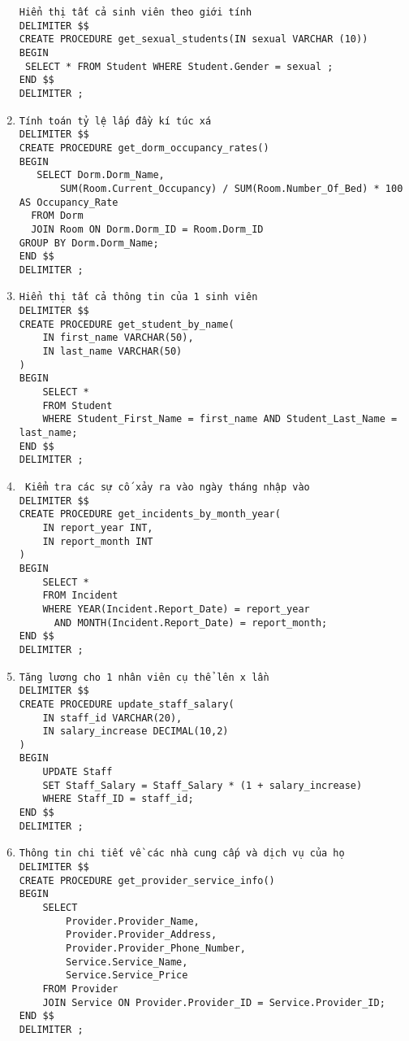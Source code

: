 \documentclass[a4paper,12pt]{article}
\begin{document}
\begin{enumerate}
\begin{verbatim}
Hiển thị tất cả sinh viên theo giới tính
DELIMITER $$
CREATE PROCEDURE get_sexual_students(IN sexual VARCHAR (10))
BEGIN 
 SELECT * FROM Student WHERE Student.Gender = sexual ;
END $$
DELIMITER ;
\end{verbatim}
\item \begin{verbatim}
Tính toán tỷ lệ lấp đầy kí túc xá
DELIMITER $$
CREATE PROCEDURE get_dorm_occupancy_rates()
BEGIN
   SELECT Dorm.Dorm_Name,
       SUM(Room.Current_Occupancy) / SUM(Room.Number_Of_Bed) * 100 AS Occupancy_Rate
  FROM Dorm
  JOIN Room ON Dorm.Dorm_ID = Room.Dorm_ID
GROUP BY Dorm.Dorm_Name;
END $$
DELIMITER ;
\end{verbatim}
\item \begin{verbatim}
Hiển thị tất cả thông tin của 1 sinh viên 
DELIMITER $$
CREATE PROCEDURE get_student_by_name(
    IN first_name VARCHAR(50),
    IN last_name VARCHAR(50)
)
BEGIN
    SELECT * 
    FROM Student
    WHERE Student_First_Name = first_name AND Student_Last_Name = last_name;
END $$
DELIMITER ;
\end{verbatim}
\item \begin{verbatim}
 Kiểm tra các sự cố xảy ra vào ngày tháng nhập vào
DELIMITER $$
CREATE PROCEDURE get_incidents_by_month_year(
    IN report_year INT,
    IN report_month INT
)
BEGIN
    SELECT *
    FROM Incident
    WHERE YEAR(Incident.Report_Date) = report_year
      AND MONTH(Incident.Report_Date) = report_month;
END $$
DELIMITER ;
\end{verbatim}
\item \begin{verbatim}
Tăng lương cho 1 nhân viên cụ thể lên x lần
DELIMITER $$
CREATE PROCEDURE update_staff_salary(
    IN staff_id VARCHAR(20),
    IN salary_increase DECIMAL(10,2)
)
BEGIN
    UPDATE Staff
    SET Staff_Salary = Staff_Salary * (1 + salary_increase)
    WHERE Staff_ID = staff_id;
END $$
DELIMITER ;
\end{verbatim}
\item \begin{verbatim}
Thông tin chi tiết về các nhà cung cấp và dịch vụ của họ
DELIMITER $$
CREATE PROCEDURE get_provider_service_info()
BEGIN
    SELECT 
        Provider.Provider_Name,
        Provider.Provider_Address,
        Provider.Provider_Phone_Number,
        Service.Service_Name,
        Service.Service_Price
    FROM Provider
    JOIN Service ON Provider.Provider_ID = Service.Provider_ID;
END $$
DELIMITER ;

\end{verbatim}
\end{enumerate}
\end{document}
